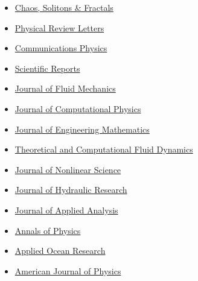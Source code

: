 \documentclass[final, a4paper, oneside, 12pt]{article}
\numberwithin{equation}{section}
\begin{document}
  \begin{itemize}

    \item \href{https://www.sciencedirect.com/journal/chaos-solitons-and-fractals/}{Chaos, Solitons \& Fractals}
  
    \item \href{https://journals.aps.org/prl/}%
    {Physical Review Letters}
    
    \item \href{https://www.nature.com/commsphys/}%
    {Communications Physics}
  
    \item \href{http://www.nature.com/srep/}%
    {Scientific Reports}
  
    \item \href{http://www.jfm.damtp.cam.ac.uk/}%
    {Journal of Fluid Mechanics}
  
    \item \href{http://www.elsevier.com/locate/jcp}%
    {Journal of Computational Physics}
    
    \item \href{http://www.springer.com/physics/classical+continuum+physics/journal/10665}%
    {Journal of Engineering Mathematics}
    
    \item \href{http://www.springer.com/materials/mechanics/journal/162}%
    {Theoretical and Computational Fluid Dynamics}
    
    \item \href{http://www.springer.com/mathematics/analysis/journal/332}%
    {Journal of Nonlinear Science}
    
    \item \href{http://www.tandfonline.com/toc/tjhr20/current}%
    {Journal of Hydraulic Research}
    
    \item \href{https://www.degruyter.com/view/journals/jaa/jaa-overview.xml}%
    {Journal of Applied Analysis}
    
    \item \href{https://www.sciencedirect.com/journal/annals-of-physics/}%
    {Annals of Physics}
    
    \item \href{http://www.journals.elsevier.com/applied-ocean-research/}%
    {Applied Ocean Research}

    \item \href{https://pubs.aip.org/aapt/ajp/}%
    {American Journal of Physics}
    

\end{itemize}
\end{document}
